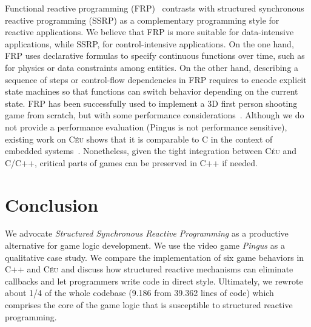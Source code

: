 \documentclass[10pt, conference, compsocconf]{IEEEtran}
\newcommand{\CEU}{\textsc{C\'{e}u}\xspace}
\begin{document}
Functional reactive programming (FRP)~\cite{frp.fran} contrasts with
structured synchronous reactive programming (SSRP) as a complementary
programming style for reactive applications.
%
We believe that FRP is more suitable for data-intensive applications, while 
SSRP, for control-intensive applications.
%
On the one hand, FRP uses declarative formulas to specify continuous functions 
over time, such as for physics or data constraints among entities.
%
On the other hand, describing a sequence of steps or control-flow dependencies
in FRP requires to encode explicit state machines so that functions can switch
behavior depending on the current state.
%
FRP has been successfully used to implement a 3D first person shooting game
from scratch, but with some performance considerations~\cite{games.frag}.
%
Although we do not provide a performance evaluation (Pingus is not performance
sensitive), existing work on \CEU shows that it is comparable to C in the
context of embedded systems~\cite{ceu.sensys13}.
Nonetheless, given the tight integration between \CEU and C/C++, critical parts
of games can be preserved in C++ if needed.

\section{Conclusion}
\label{sec.conclusion}

We advocate \emph{Structured Synchronous Reactive Programming} as a productive
alternative for game logic development.
%
We use the video game \emph{Pingus} as a qualitative case study.
We compare the implementation of six game behaviors in C++ and \CEU and discuss
how structured reactive mechanisms can eliminate callbacks and let programmers
write code in direct style.
%
Ultimately, we rewrote about 1/4 of the whole codebase (9.186 from 39.362 lines
of code) which comprises the core of the game logic that is susceptible to
structured reactive programming.
\end{document}
